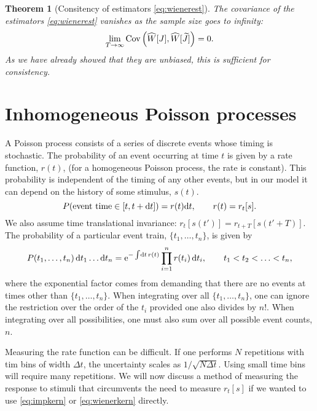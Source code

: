 \documentclass[12pt]{article}
\theoremstyle{slplain}
\newtheorem{thm}{Theorem}
\theoremstyle{sldefinition}
\theoremstyle{remark}
\newcommand{\tj}{\widetilde{J}}
\newcommand{\hw}{\widehat{W}}
\begin{document}
\begin{thm}[Consitency of estimators \eqref{eq:wienerest}]\label{th:wienercons}
  The covariance of the estimators \eqref{eq:wienerest} vanishes as the sample size goes to infinity:
  \begin{equation}\label{eq:wienercons}
    \lim_{T\to\infty} \cov\prn{ \hw[J], \hw[\tj] } = 0.
  \end{equation}
  As we have already showed that they are unbiased, this is sufficient for consistency.
\end{thm}





\section{Inhomogeneous Poisson processes}\label{sec:poisson}

A Poisson process consists of a series of discrete events whose timing is stochastic. The probability of an event occurring at time $t$ is given by a rate function, $r(t)$, (for a homogeneous Poisson process, the rate is constant). This probability is independent of the timing of any other events, but in our model it can depend on the history of some stimulus, $s(t)$.
%
\begin{equation}\label{eq:poissonrate}
  P(\text{event time}\in[t,t+\mathrm{d} t]) = r(t)\mathrm{d} t,
  \qquad
  r(t) = r_t[s].
\end{equation}
%
We also assume time translational invariance: $r_t[s(t')] = r_{t+T}[s(t'+T)]$. The probability of a particular event train, $\{t_1,\ldots,t_n\}$, is given by
%
\begin{equation}\label{eq:evtrain}
  P(t_1,\ldots,t_n)\,\mathrm{d} t_1\ldots \mathrm{d} t_n = \mathrm{e}^{-\int\!\mathrm{d} t\,r(t)} \prod_{i=1}^n r(t_i)\,\mathrm{d} t_i, \qquad t_1<t_2<\ldots<t_n,
\end{equation}
%
where the exponential factor comes from demanding that there are no events at times other than $\{t_1,\ldots,t_n\}$. When integrating over all $\{t_1,\ldots,t_n\}$, one can ignore the restriction over the order of the $t_i$ provided one also divides by $n!$. When integrating over all possibilities, one must also sum over all possible event counts, $n$.

Measuring the rate function can be difficult. If one performs $N$ repetitions with tim bins of width $\Delta t$, the uncertainty scales as $1/\sqrt{N\Delta t}$. Using small time bins will require many repetitions. We will now discuss a method of measuring the response to stimuli that circumvents the need to measure $r_t[s]$ if we wanted to use \eqref{eq:impkern} or \eqref{eq:wienerkern} directly. 
\end{document}
